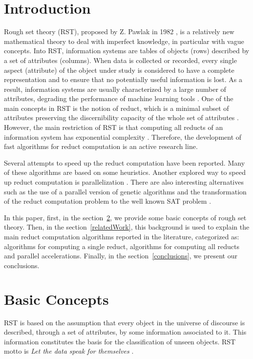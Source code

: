 \documentclass[citenumber]{llncs}
\begin{document}
\section{Introduction}
%
	Rough set theory (RST), proposed by Z. Pawlak in 1982 \cite{Pawlak81,Pawlak81-2,Pawlak82,Pawlak91}, is a relatively new mathematical theory to deal with imperfect knowledge, in particular with vague concepts. Into RST, information systems are tables of objects (rows) described by a set of attributes (columns). When data is collected or recorded, every single aspect (attribute) of the object under study is considered to have a complete representation and to ensure that no potentially useful information is lost. As a result, information systems are usually characterized by a large number of attributes,  degrading the performance of machine learning tools \cite{Parthalain08}. One of the main concepts in RST is the notion of reduct, which is a minimal subset of attributes preserving the discernibility capacity of the whole set of attributes \cite{Pawlak91}. However, the main restriction of RST is that computing all reducts of an information system has exponential complexity \cite{Skowron92}. Therefore, the development of fast algorithms for reduct computation is an active research line.
  
	Several attempts to speed up the reduct computation have been reported. Many of these algorithms are based on some heuristics. Another explored way to speed up reduct computation is parallelization \cite{Strakowski08}. There are also interesting alternatives such as the use of a parallel version of genetic algorithms \cite{Wroblewski98} and the transformation of the reduct computation problem to the well known SAT problem \cite{Jensen14}.
	
	In this paper, first, in the section~\ref{basicConcepts}, we provide some basic concepts of rough set theory. Then, in the section~\ref{relatedWork}, this background is used to explain the main reduct computation algorithms reported in the literature, categorized as: algorithms for computing a single reduct, algorithms for computing all reducts and parallel accelerations. Finally, in the section~\ref{conclusions}, we present our conclusions.

\section{Basic Concepts}\label{basicConcepts}
  RST is based on the assumption that every object in the universe of discourse is described, through a 
  set of attributes, by some information associated to it. This information constitutes the basis for the
  classification of unseen objects. RST motto is \textit{Let the data speak for themselves} \cite{Tiwari14}.
  
\end{document}
